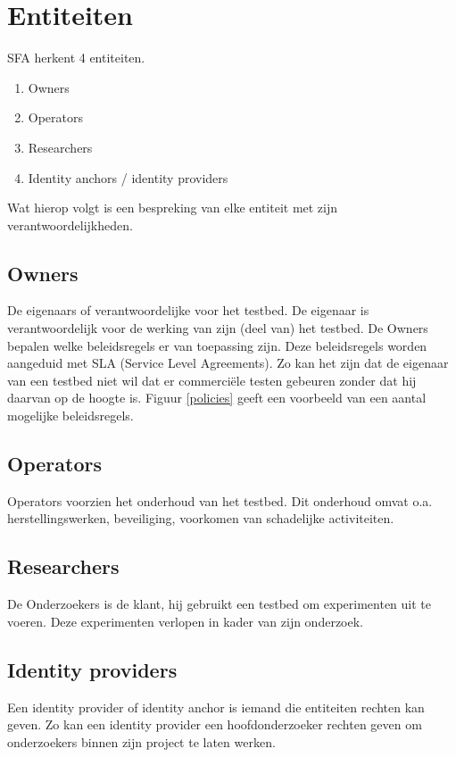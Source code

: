 \section{Entiteiten}
\npar
SFA herkent 4 entiteiten.
\begin{enumerate}
\item Owners
\item Operators
\item Researchers
\item Identity anchors / identity providers
\end{enumerate}
Wat hierop volgt is een bespreking van elke entiteit met zijn verantwoordelijkheden.

\subsection{Owners}
\npar
De eigenaars of verantwoordelijke voor het testbed. De eigenaar is verantwoordelijk voor de werking van zijn (deel van) het testbed. De Owners bepalen welke beleidsregels er van toepassing zijn. Deze beleidsregels worden aangeduid met SLA (Service Level Agreements). Zo kan het zijn dat de eigenaar van een testbed niet wil dat er commerciële testen gebeuren zonder dat hij daarvan op de hoogte is. Figuur \ref{policies} geeft een voorbeeld van een aantal mogelijke beleidsregels.

\subsection{Operators}
\npar
Operators voorzien het onderhoud van het testbed. Dit onderhoud omvat o.a. herstellingswerken, beveiliging, voorkomen van schadelijke activiteiten.

\subsection{Researchers}
\npar
De Onderzoekers is de klant, hij gebruikt een testbed om experimenten uit te voeren. Deze experimenten verlopen in kader van zijn onderzoek.

\subsection{Identity providers}
\npar
Een identity provider of identity anchor is iemand die entiteiten rechten kan geven. Zo kan een identity provider een hoofdonderzoeker rechten geven om onderzoekers binnen zijn project te laten werken.


